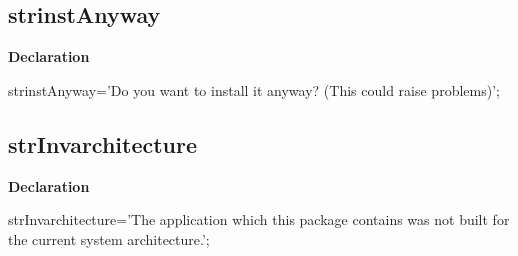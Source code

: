 \documentclass{report}
\newif\ifpdf
\begin{document}
\subsection*{strinstAnyway}
\fi
\label{trstrings-strinstAnyway}
\begin{list}{}{
\setlength{\itemindent}{0cm}
\setlength{\listparindent}{0cm}
\setlength{\leftmargin}{\evensidemargin}
\addtolength{\leftmargin}{\tmplength}
\settowidth{\labelsep}{X}
\addtolength{\leftmargin}{\labelsep}
\setlength{\labelwidth}{\tmplength}
}
\item[\textbf{Declaration}\hfill]
\ifpdf
\begin{flushleft}
\fi
\begin{ttfamily}
strinstAnyway='Do you want to install it anyway? (This could raise problems)';\end{ttfamily}

\ifpdf
\end{flushleft}
\fi

\end{list}
\ifpdf
\subsection*{\large{\textbf{strInvarchitecture}}\normalsize\hspace{1ex}\hrulefill}
\else
\subsection*{strInvarchitecture}
\fi
\label{trstrings-strInvarchitecture}
\begin{list}{}{
\setlength{\itemindent}{0cm}
\setlength{\listparindent}{0cm}
\setlength{\leftmargin}{\evensidemargin}
\addtolength{\leftmargin}{\tmplength}
\settowidth{\labelsep}{X}
\addtolength{\leftmargin}{\labelsep}
\setlength{\labelwidth}{\tmplength}
}
\item[\textbf{Declaration}\hfill]
\ifpdf
\begin{flushleft}
\fi
\begin{ttfamily}
strInvarchitecture='The application which this package contains was not built for the current system architecture.';\end{ttfamily}

\ifpdf
\end{flushleft}
\fi

\end{list}
\ifpdf
\end{document}
